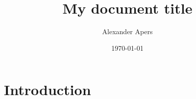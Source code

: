 \documentclass[a4paper]{article}
\title{\huge{My document title}}
\author{Alexander Apers}
\affil{\small{Utrecht University\\ \href{a.p.apers@uu.nl}{a.p.apers@uu.nl}}}
\date{\today}
\begin{document}
    \maketitle
    \tableofcontents

    \section{Introduction}
    \lipsum
\end{document}
